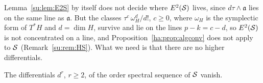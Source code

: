 Lemma~\ref{su:lem:E2S} by itself does not decide where \(E^2(\mathcal S)\)
lives, since \(d\tau\wedge\mathfrak a\) lies on the same line as
\(\mathfrak a\). But the classes \(\tau^c\,\omega_H^d/d!\), \(c\ge0\), where \(\omega_H\) is
the symplectic form of \(T^*H\) and \(d=\dim H\), survive and lie on the lines \(p-k=c-d\), so
\(E^2(\mathcal S)\) is not concentrated on a line, and
Proposition~\ref{ha:prop:algconv} does not apply to \(\mathcal S\)
(Remark~\ref{su:rem:HS}). What we need is that there are no higher
differentials.

\begin{proposition}\label{su:prop:degS}
The differentials \(d^r\), \(r\ge2\), of the order spectral sequence of
\(\mathcal S\) vanish.
\end{proposition}

